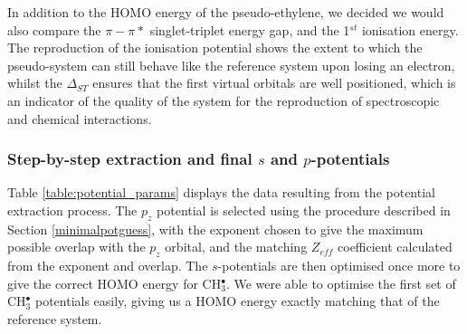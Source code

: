 \documentclass[12pt]{article}
\begin{document}
In addition to the HOMO energy of the pseudo-ethylene, we decided we would also compare the $\pi-\pi*$ singlet-triplet energy gap, and the 1$^{st}$ ionisation energy. The reproduction of the ionisation potential shows the extent to which the pseudo-system can still behave like the reference system upon losing an electron, whilst the $\Delta_{ST}$ ensures that the first virtual orbitals are well positioned, which is an indicator of the quality of the system for the reproduction of spectroscopic and chemical interactions.

%


\subsubsection*{\sffamily \large Step-by-step extraction and final \(s\) and \(p\)-potentials}

Table \ref{table:potential_params} displays the data resulting from the potential extraction process. The \(p_{z}\) potential is selected using the procedure described in Section \ref{minimalpotguess}, with the exponent chosen to give the maximum possible overlap with the \(p_{z}\) orbital, and the matching \(Z_{eff}\) coefficient calculated from the exponent and overlap.
The \(s\)-potentials are then optimised once more to give the correct HOMO energy for CH\(^{\bullet}_{3}\). We were able to optimise the first set of CH\(^{\bullet}_{3}\) potentials easily, giving us a HOMO energy exactly matching that of the reference system. 
\end{document}
